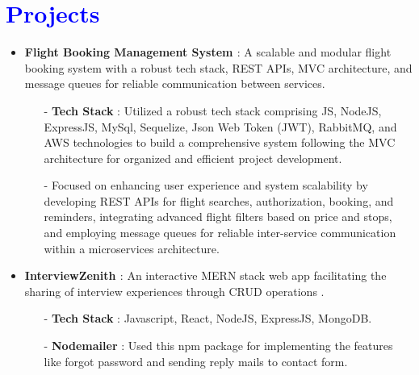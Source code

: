 \documentclass[letterpaper,11pt]{article}
\newcommand{\resumeItem}[2]{
  \item\small{
    \textbf{#1}{: #2 \vspace{-2pt}}
  }
}
\newcommand{\resumeSubHeadingListStart}{\begin{itemize}[leftmargin=*]}
\newcommand{\resumeItemListEnd}{\end{itemize}\vspace{-5pt}}
\begin{document}
\section{\textbf{\textcolor{blue}{Projects}}}
  \resumeSubHeadingListStart
  \resumeItem{Flight Booking Management System \href{https://github.com/SubratYeeshu/Flight-Booking-Management-System}{\faExternalLink}}{A scalable and modular flight booking system with a robust tech stack, REST APIs, MVC architecture, and message queues for reliable communication between services.}
      \begin{itemize}
          \item[-] \textbf{Tech Stack} : Utilized a robust tech stack comprising JS, NodeJS, ExpressJS, MySql, Sequelize, Json Web Token (JWT), RabbitMQ, and AWS technologies to build a comprehensive system following the MVC architecture for organized and efficient project development.
          \item[-] Focused on enhancing user experience and system scalability by developing REST APIs for flight searches, authorization, booking, and reminders, integrating advanced flight filters based on price and stops, and employing message queues for reliable inter-service communication within a microservices architecture.
      \end{itemize}
      
     \resumeItem{InterviewZenith \href{https://interviewzenith.netlify.app/}{\faExternalLink}} {An interactive MERN stack web app facilitating the sharing of interview experiences through CRUD operations}. 
      \begin{itemize}
          \item[-] \textbf{Tech Stack} : Javascript, React, NodeJS, ExpressJS, MongoDB.
          \item[-]\textbf{Nodemailer} : Used this npm package for implementing the features like forgot password and sending reply mails to contact form.
          
      \end{itemize}

    

 \resumeItemListEnd

\end{document}
